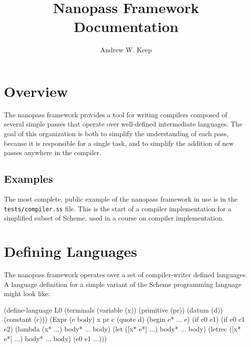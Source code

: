 \documentclass[letterpaper,10pt]{article}
\title{Nanopass Framework Documentation}
\author{Andrew W. Keep}
\begin{document}
\maketitle

\section{Overview}
The nanopass framework provides a tool for writing compilers composed of
several simple passes that operate over well-defined intermediate languages.
The goal of this organization is both to simplify the understanding of each
pass, because it is responsible for a single task, and to simplify the addition
of new passes anywhere in the compiler.

\subsection{Examples}
The most complete, public example of the nanopass framework in use is in the
\texttt{tests/compiler.ss} file.
This is the start of a compiler implementation for a simplified subset of
Scheme, used in a course on compiler implementation.

\section{Defining Languages}

The nanopass framework operates over a set of compiler-writer defined
languages.
A language definition for a simple variant of the Scheme programming language
might look like:

\begin{schemedisplay}
(define-language L0
  (terminals
    (variable (x))
    (primitive (pr))
    (datum (d))
    (constant (c)))
  (Expr (e body)
    x
    pr
    c
    (quote d)
    (begin e* ... e)
    (if e0 e1)
    (if e0 e1 e2)
    (lambda (x* ...) body* ... body)
    (let ([x* e*] ...) body* ... body)
    (letrec ([x* e*] ...) body* ... body)
    (e0 e1 ...)))
\end{schemedisplay}
\end{document}
